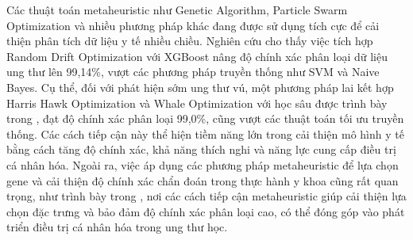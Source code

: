 Các thuật toán metaheuristic như Genetic Algorithm, Particle Swarm Optimization và nhiều phương pháp khác đang được sử dụng tích cực để cải thiện phân tích dữ liệu y tế nhiều chiều. Nghiên cứu  cho thấy việc tích hợp Random Drift Optimization với XGBoost nâng độ chính xác phân loại dữ liệu ung thư lên 99,14\%, vượt các phương pháp truyền thống như SVM và Naive Bayes. Cụ thể, đối với phát hiện sớm ung thư vú, một phương pháp lai kết hợp Harris Hawk Optimization và Whale Optimization với học sâu được trình bày trong , đạt độ chính xác phân loại 99,0\%, cũng vượt các thuật toán tối ưu truyền thống. Các cách tiếp cận này thể hiện tiềm năng lớn trong cải thiện mô hình y tế bằng cách tăng độ chính xác, khả năng thích nghi và năng lực cung cấp điều trị cá nhân hóa. Ngoài ra, việc áp dụng các phương pháp metaheuristic để lựa chọn gene và cải thiện độ chính xác chẩn đoán trong thực hành y khoa cũng rất quan trọng, như trình bày trong , nơi các cách tiếp cận metaheuristic giúp cải thiện lựa chọn đặc trưng và bảo đảm độ chính xác phân loại cao, có thể đóng góp vào phát triển điều trị cá nhân hóa trong ung thư học.
